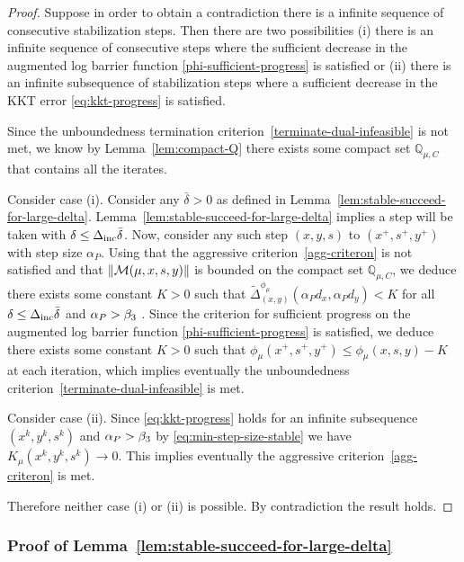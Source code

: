 \documentclass{article}
\begin{document}
\begin{proof}
Suppose in order to obtain a contradiction there is a infinite sequence of consecutive stabilization steps. Then there are two possibilities (i) there is an infinite sequence of consecutive steps where the sufficient decrease in the augmented log barrier function \eqref{phi-sufficient-progress} is satisfied or (ii) there is an infinite subsequence of stabilization steps where a sufficient decrease in the KKT error \eqref{eq:kkt-progress} is satisfied.

Since the unboundedness termination criterion~\eqref{terminate-dual-infeasible} is not met, we know by Lemma~\ref{lem:compact-Q} there exists some compact set $\mathbb{Q}_{\mu,C}$ that contains all the iterates.

Consider case (i). Consider any $\bar{\delta} > 0$ as defined in Lemma~\ref{lem:stable-succeed-for-large-delta}. Lemma~\ref{lem:stable-succeed-for-large-delta} implies a step will be taken with $\delta \le \Delta_{\text{inc}} \bar{\delta}$. Now, consider any such step $(x,y,s)$ to $(x^{+}, s^{+}, y^{+})$ with step size $\alpha_{P}$. Using that the aggressive criterion~\eqref{agg-criteron} is not satisfied and that $\| \mathcal{M}(\mu, x, s, y) \|$ is bounded on the compact set $\mathbb{Q}_{\mu,C}$, we deduce there exists some constant $K > 0$ such that $\tilde{\Delta}^{\phi_{\mu}}_{(x,y)}(\alpha_{P} d_{x}, \alpha_{P} d_{y}) < K$ for all $\delta \le \Delta_{\text{inc}} \bar{\delta}$ and $\alpha_{P} > \beta_{3}$ . Since the criterion for sufficient progress on the augmented log barrier function \eqref{phi-sufficient-progress} is satisfied, we deduce there exists some constant $K > 0$ such that $\phi_{\mu}(x^{+}, s^{+}, y^{+}) \le \phi_{\mu}(x, s, y) - K$ at each iteration, which implies eventually the unboundedness criterion~\eqref{terminate-dual-infeasible} is met. 

Consider case (ii). Since \eqref{eq:kkt-progress} holds for an infinite subsequence $(x^{k}, y^{k}, s^{k})$ and $\alpha_{P} > \beta_{3}$ by \eqref{eq:min-step-size-stable} we have $K_{\mu}(x^{k}, y^{k}, s^{k}) \rightarrow 0$. This implies eventually the aggressive criterion~\eqref{agg-criteron} is met.

Therefore neither case (i) or (ii) is possible. By contradiction the result holds.
\end{proof}


\subsubsection{Proof of Lemma~\ref{lem:stable-succeed-for-large-delta}}\label{sec:lem:stable-succeed-for-large-delta}
\end{document}
